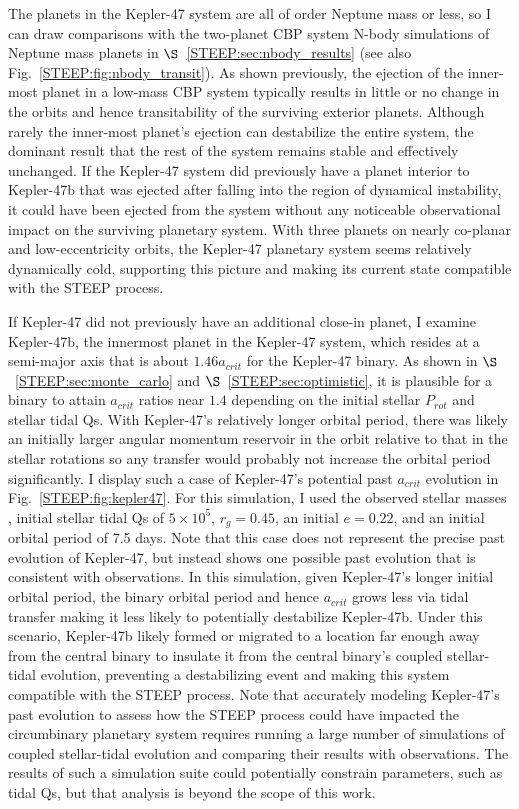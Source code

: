 The planets in the Kepler-47 system are all of order Neptune mass or less, so I can draw comparisons with the two-planet CBP system N-body simulations of Neptune mass planets in $\S$~\ref{STEEP:sec:nbody_results} (see also Fig.~\ref{STEEP:fig:nbody_transit}).  As shown previously, the ejection of the inner-most planet in a low-mass CBP system typically results in little or no change in the orbits and hence transitability of the surviving exterior planets.  Although rarely the inner-most planet's ejection can destabilize the entire system, the dominant result that the rest of the system remains stable and effectively unchanged.  If the Kepler-47 system did previously have a planet interior to Kepler-47b that was ejected after falling into the region of dynamical instability, it could have been ejected from the system without any noticeable observational impact on the surviving planetary system.  With three planets on nearly co-planar and low-eccentricity orbits, the Kepler-47 planetary system seems relatively dynamically cold, supporting this picture and making its current state compatible with the STEEP process.

If Kepler-47 did not previously have an additional close-in planet, I examine Kepler-47b, the innermost planet in the Kepler-47 system, which resides at a semi-major axis that is about $1.46 a_{crit}$ for the Kepler-47 binary.  As shown in $\S$~\ref{STEEP:sec:monte_carlo} and $\S$~\ref{STEEP:sec:optimistic}, it is plausible for a binary to attain $a_{crit}$ ratios near $1.4$ depending on the initial stellar $P_{rot}$ and stellar tidal Qs.  With Kepler-47's relatively longer orbital period, there was likely an initially larger angular momentum reservoir in the orbit relative to that in the stellar rotations so any transfer would probably not increase the orbital period significantly.  I display such a case of Kepler-47's potential past $a_{crit}$ evolution in Fig.~\ref{STEEP:fig:kepler47}.  For this simulation, I used the observed stellar masses \citep{Orosz2012}, initial stellar tidal Qs of $5 \times 10^5$, $r_g = 0.45$, an initial $e = 0.22$, and an initial orbital period of 7.5 days.  Note that this case does not represent the precise past evolution of Kepler-47, but instead shows one possible past evolution that is consistent with observations.  In this simulation, given Kepler-47's longer initial orbital period, the binary orbital period and hence $a_{crit}$ grows less via tidal transfer making it less likely to potentially destabilize Kepler-47b.  Under this scenario, Kepler-47b likely formed or migrated to a location far enough away from the central binary to insulate it from the central binary's coupled stellar-tidal evolution, preventing a destabilizing event and making this system compatible with the STEEP process.  Note that accurately modeling Kepler-47's past evolution to assess how the STEEP process could have impacted the circumbinary planetary system requires running a large number of simulations of coupled stellar-tidal evolution and comparing their results with observations.  The results of such a simulation suite could potentially constrain parameters, such as tidal Qs, but that analysis is beyond the scope of this work.

